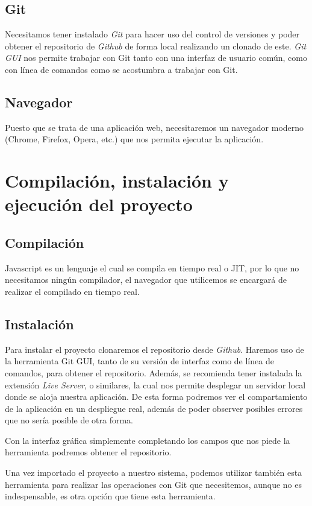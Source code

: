 \subsection{Git}
Necesitamos tener instalado \emph{Git} para hacer uso del control de versiones y poder obtener el repositorio de \emph{Github} de forma local realizando un clonado de este. \emph{Git GUI} nos permite trabajar con Git tanto con una interfaz de usuario común, como con línea de comandos como se acostumbra a trabajar con Git.

\subsection{Navegador}
Puesto que se trata de una aplicación web, necesitaremos un navegador moderno (Chrome, Firefox, Opera, etc.) que nos permita ejecutar la aplicación.

\section{Compilación, instalación y ejecución del proyecto}

\subsection{Compilación}
Javascript es un lenguaje el cual se compila en tiempo real o JIT\cite{wiki:jit}, por lo que no necesitamos ningún compilador, el navegador que utilicemos se encargará de realizar el compilado en tiempo real.

\subsection{Instalación}
Para instalar el proyecto clonaremos el repositorio desde \emph{Github}. Haremos uso de la herramienta Git GUI, tanto de su versión de interfaz como de línea de comandos, para obtener el repositorio. Además, se recomienda tener instalada la extensión \emph{Live Server}, o similares, la cual nos permite desplegar un servidor local donde se aloja nuestra aplicación. De esta forma podremos ver el compartamiento de la aplicación en un despliegue real, además de poder observer posibles errores que no sería posible de otra forma.

Con la interfaz gráfica simplemente completando los campos que nos piede la herramienta podremos obtener el repositorio.

Una vez importado el proyecto a nuestro sistema, podemos utilizar también esta herramienta para realizar las operaciones con Git que necesitemos, aunque no es indespensable, es otra opción que tiene esta herramienta.

